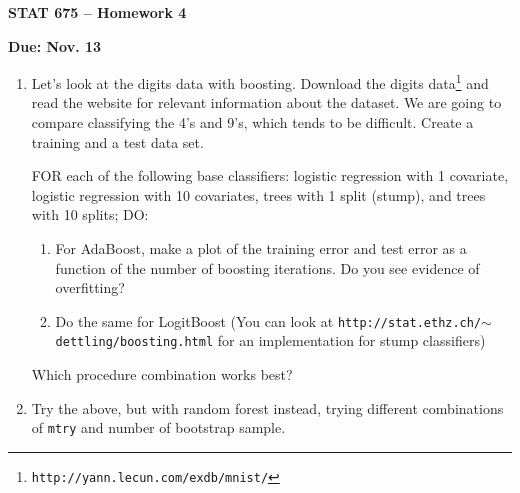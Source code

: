 \documentclass[11pt]{article}
\begin{document}
\baselineskip=13.2pt
\parindent=0pt
\parskip=13.2pt
\pagestyle{empty}

\renewcommand{\mu}{\textrm{mu}}
\newcommand{\sd}{\textrm{sd}}
\centerline{\bf \Large STAT 675 -- Homework 4}
\centerline{\bf \large Due: Nov. 13}
\begin{enumerate}
\item Let's look at the digits data with boosting.
Download the digits data\footnote{{\tt http://yann.lecun.com/exdb/mnist/}} and 
read the website for relevant information about the dataset.  We are going to compare classifying
the 4's and 9's, which tends to be difficult.  Create a training and a test data set.

FOR each of the following base classifiers: logistic regression with 1 covariate, logistic regression with 10 covariates, trees with 1 split (stump), and trees with 10 splits; DO:
\begin{enumerate}
\item For AdaBoost, make a plot of the training error and test error as a function of the number of boosting iterations.  Do you see evidence of overfitting?
\item Do the same for LogitBoost (You can look at {\tt http://stat.ethz.ch/$\sim$dettling/boosting.html} for an implementation for stump classifiers)
\end{enumerate}
Which procedure combination works best?

\vspace{2in}
\item Try the above, but with random forest instead, trying different combinations of {\tt mtry} and number of bootstrap sample.
\end{enumerate}
\end{document}
